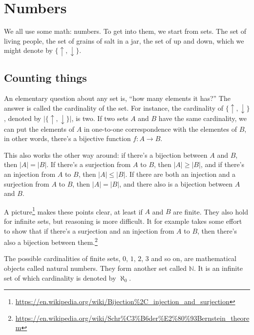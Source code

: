 \documentclass[11pt,oneside,%
]{memoir}
\newcommand{\NN}{\mathbb{N}}
\newcommand{\RR}{\mathbb{R}}
\newcommand{\CC}{\mathbb{C}}
\newcommand{\ZZ}{\mathbb{Z}}
\newcommand{\QQ}{\mathbb{Q}}
\begin{document}
\chapter{Numbers}

We all use some math: numbers. To get into them, we start from sets. The set of living people, the set of grains of salt in a jar, the set of up and down, which we might denote by \(\lbrace\uparrow,\downarrow\rbrace\). %

\section{Counting things}

An elementary question about any set is, ``how many elements it has?'' The answer is called the cardinality of the set. For instance, the cardinality of \(\lbrace\uparrow,\downarrow\rbrace\), denoted by \(|\lbrace\uparrow,\downarrow\rbrace|\), is two. If two sets \(A\) and \(B\) have the same cardinality, we can put the elements of \(A\) in one-to-one correspondence with the elementes of \(B\), in other words, there's a bijective function \(f:A\rightarrow B\). %

This also works the other way around: if there's a bijection between \(A\) and \(B\), then \(|A|=|B|\). If there's a surjection from \(A\) to \(B\), then \(|A|\geq|B|\), and if there's an injection from \(A\) to \(B\), then \(|A|\leq|B|\). If there are both an injection and a surjection from \(A\) to \(B\), then \(|A|=|B|\), and there also is a bijection between \(A\) and \(B\).

A picture\footnote{\url{https://en.wikipedia.org/wiki/Bijection\%2C_injection_and_surjection}} makes these points clear, at least if \(A\) and \(B\) are finite. They also hold for infinite sets, but reasoning is more difficult. It for example takes some effort to show that if there's a surjection and an injection from \(A\) to \(B\), then there's also a bijection between them.\footnote{\url{https://en.wikipedia.org/wiki/Schr\%C3\%B6der\%E2\%80\%93Bernstein_theorem}}

The possible cardinalities of finite sets, \(0\), \(1\), \(2\), \(3\) and so on, are mathematical objects called natural numbers. They form another set called \(\NN\). It is an infinite set of which cardinality is denoted by \(\aleph_0\).
\end{document}
